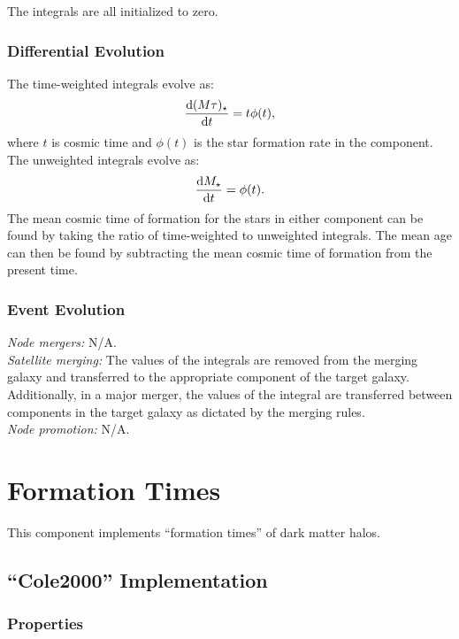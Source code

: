 The integrals are all initialized to zero.

\subsubsection{Differential Evolution}

The time-weighted integrals evolve as:
\begin{equation}
{{\mathrm d}({M\tau})_\star\over{\mathrm d}t} = t \phi(t),
\end{equation}
where $t$ is cosmic time and $\phi(t)$ is the star formation rate in the component. The unweighted integrals evolve as:
\begin{equation}
{{\mathrm d}{M}_\star\over{\mathrm d}t} = \phi(t).
\end{equation}
The mean cosmic time of formation for the stars in either component can be found by taking the ratio of time-weighted to unweighted integrals. The mean age can then be found by subtracting the mean cosmic time of formation from the present time.

\subsubsection{Event Evolution}

\noindent\emph{Node mergers:} N/A.\\

\noindent\emph{Satellite merging:} The values of the integrals are removed from the merging galaxy and transferred to the appropriate component of the target galaxy. Additionally, in a major merger, the values of the integral are transferred between components in the target galaxy as dictated by the merging rules.\\

\noindent\emph{Node promotion:} N/A.\\

\section{Formation Times}\label{sec:ComponentFormationTimes}

This \gls{component} implements ``formation times'' of dark matter halos.

\subsection{``Cole2000'' Implementation}

\subsubsection{Properties}

